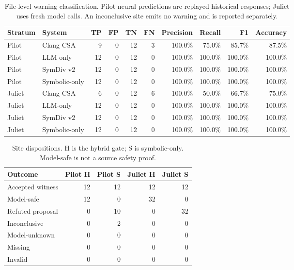 \begin{table}[t]
\caption{File-level warning classification. Pilot neural predictions are replayed historical responses; Juliet uses fresh model calls. An inconclusive site emits no warning and is reported separately.}
\label{tab:classification}
\centering\small
\begin{tabular}{llrrrrrrrr}\toprule
Stratum & System & TP & FP & TN & FN & Precision & Recall & F1 & Accuracy\\\midrule
Pilot & Clang CSA & 9 & 0 & 12 & 3 & 100.0\% & 75.0\% & 85.7\% & 87.5\%\\
Pilot & LLM-only & 12 & 0 & 12 & 0 & 100.0\% & 100.0\% & 100.0\% & 100.0\%\\
Pilot & SymDiv v2 & 12 & 0 & 12 & 0 & 100.0\% & 100.0\% & 100.0\% & 100.0\%\\
Pilot & Symbolic-only & 12 & 0 & 12 & 0 & 100.0\% & 100.0\% & 100.0\% & 100.0\%\\
\midrule
Juliet & Clang CSA & 6 & 0 & 12 & 6 & 100.0\% & 50.0\% & 66.7\% & 75.0\%\\
Juliet & LLM-only & 12 & 0 & 12 & 0 & 100.0\% & 100.0\% & 100.0\% & 100.0\%\\
Juliet & SymDiv v2 & 12 & 0 & 12 & 0 & 100.0\% & 100.0\% & 100.0\% & 100.0\%\\
Juliet & Symbolic-only & 12 & 0 & 12 & 0 & 100.0\% & 100.0\% & 100.0\% & 100.0\%\\
\bottomrule\end{tabular}
\end{table}
\begin{table}[t]
\caption{Site dispositions. H is the hybrid gate; S is symbolic-only. Model-safe is not a source safety proof.}
\label{tab:dispositions}
\centering\small
\begin{tabular}{lrrrr}\toprule
Outcome & Pilot H & Pilot S & Juliet H & Juliet S\\\midrule
Accepted witness & 12 & 12 & 12 & 12\\
Model-safe & 12 & 0 & 32 & 0\\
Refuted proposal & 0 & 10 & 0 & 32\\
Inconclusive & 0 & 2 & 0 & 0\\
Model-unknown & 0 & 0 & 0 & 0\\
Missing & 0 & 0 & 0 & 0\\
Invalid & 0 & 0 & 0 & 0\\
\bottomrule\end{tabular}
\end{table}
